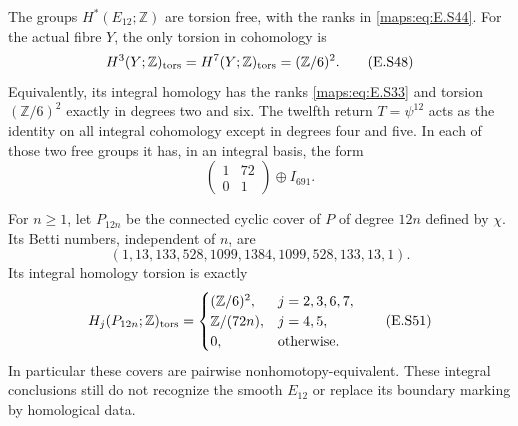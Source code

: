 

The groups $H^*(E_{12};\mathbb Z)$ are torsion free, with
the ranks in \eqref{maps:eq:E.S44}. For the actual fibre $Y$, the only
torsion in cohomology is
\[
       H^3(Y;\mathbb Z)_{\rm tors}
       =H^7(Y;\mathbb Z)_{\rm tors}=(\mathbb Z/6)^2.
 \tag{E.S48}\label{maps:eq:E.S48}
\]
Equivalently, its integral homology has the ranks \eqref{maps:eq:E.S33}
and torsion $(\mathbb Z/6)^2$ exactly in degrees two and six.
The twelfth return $T=\psi^{12}$ acts as the identity on
all integral cohomology except in degrees four and five.
In each of those two free groups it has, in an integral
basis, the form
\[
             \begin{pmatrix}1&72\\0&1\end{pmatrix}
                                  \oplus I_{691}.
 \tag{E.S49}\label{maps:eq:E.S49}
\]

For $n\geq1$, let $P_{12n}$ be the connected cyclic cover
of $P$ of degree $12n$ defined by $\chi$. Its Betti numbers,
independent of $n$, are
\[
       (1,13,133,528,1099,1384,1099,528,133,13,1).
 \tag{E.S50}\label{maps:eq:E.S50}
\]
Its integral homology torsion is exactly
\[
 H_j(P_{12n};\mathbb Z)_{\rm tors}=
 \begin{cases}
       (\mathbb Z/6)^2,&j=2,3,6,7,\\
       \mathbb Z/(72n),&j=4,5,\\
       0,&\text{otherwise}.
 \end{cases}
 \tag{E.S51}\label{maps:eq:E.S51}
\]
In particular these covers are pairwise nonhomotopy-equivalent.
These integral conclusions still do not recognize the smooth
$E_{12}$ or replace its boundary marking by homological data.

